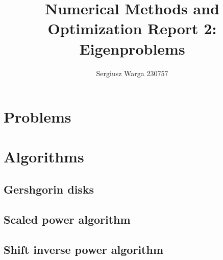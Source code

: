 \documentclass[a4paper]{article}
\title{Numerical Methods and Optimization Report 2:
  Eigenproblems}
\author{Sergiusz Warga 230757}
\date{}
\begin{document}
\maketitle
\tableofcontents
\pagebreak

\section{Problems}





\clearpage

\section{Algorithms}
\subsection{Gershgorin disks}%
\label{algorithm:gershgorin}

\subsection{Scaled power algorithm}

\subsection{Shift inverse power algorithm}



\clearpage

\nocite{Meyer, GoluVanl96, Zdunek}


\end{document}
